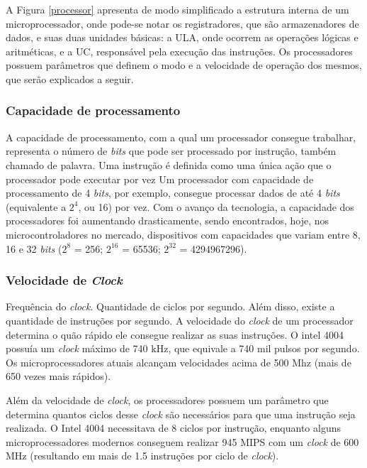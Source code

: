 
A Figura \ref{processor} apresenta de modo simplificado a estrutura interna de um microprocessador, onde pode-se notar os registradores, que são armazenadores de dados, e suas duas unidades básicas: a \ac{ULA}, onde ocorrem as operações lógicas e aritméticas, e a \ac{UC}, responsável pela execução das instruções. %
Os processadores possuem parâmetros que definem o modo e a velocidade de operação dos mesmos, que serão explicados a seguir.

\subsubsection{Capacidade de processamento}

A capacidade de processamento, com a qual um processador consegue trabalhar, representa o número de \textit{bits} que pode ser processado por instrução, também chamado de palavra. Uma instrução é definida como uma única ação que o processador pode executar por vez %
Um processador com capacidade de processamento de 4 \textit{bits}, por exemplo, consegue processar dados de até 4 \textit{bits} (equivalente a \(2^4\), ou 16) por vez. Com o avanço da tecnologia, a capacidade dos processadores foi aumentando drasticamente, sendo encontrados, hoje, nos microcontroladores no mercado, dispositivos com capacidades que variam entre 8, 16 e 32 \textit{bits} (\(2^8\) = 256; \(2^16\) = 65536; \(2^32\) = 4294967296).

\subsubsection{Velocidade de \textit{Clock}}

Frequência do \textit{clock}. Quantidade de ciclos por segundo. Além disso, existe a quantidade de instruções por segundo. A velocidade do \textit{clock} de um processador determina o quão rápido ele consegue realizar as suas instruções. O intel 4004 possuía um \textit{clock} máximo de 740 kHz, que equivale a 740 mil pulsos por segundo. Os microprocessadores atuais alcançam velocidades acima de 500 Mhz (mais de 650 vezes mais rápidos). 

Além da velocidade de \textit{clock}, os processadores possuem um parâmetro que determina quantos ciclos desse \textit{clock} são necessários para que uma instrução seja realizada. O Intel 4004 necessitava de 8 ciclos por instrução, enquanto alguns microprocessadores modernos conseguem realizar 945 \ac{MIPS} com um \textit{clock} de 600 MHz (resultando em mais de 1.5 instruções por ciclo de \textit{clock})\cite{clock}. %

